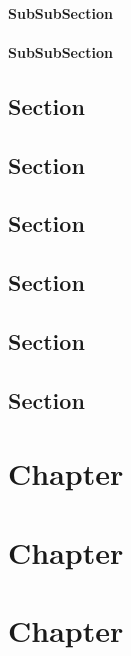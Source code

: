 \subsubsection{SubSubSection}
\subsubsection{SubSubSection}


\section{Section}
\section{Section}
\section{Section}

\begin{footnotesize}

\end{footnotesize}



\section{Section}
\section{Section}
\section{Section}

\begin{footnotesize}

\end{footnotesize}


\chapter{Chapter}

\chapter{Chapter}



\chapter{Chapter}

